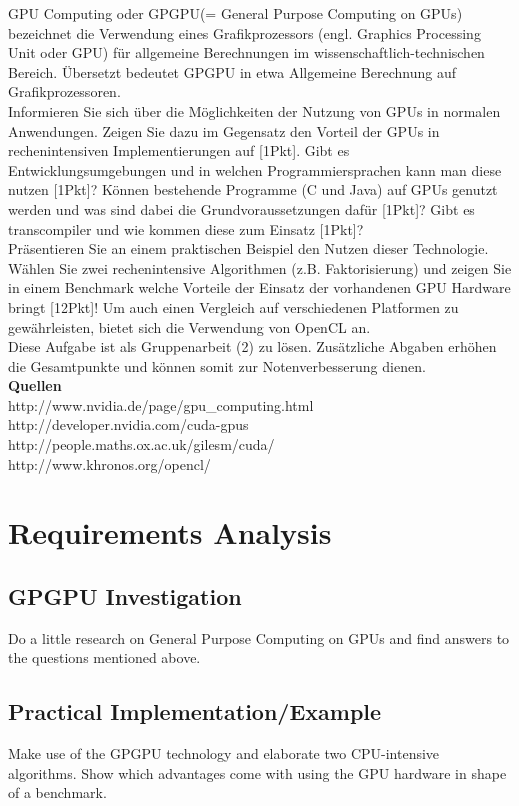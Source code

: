 \documentclass[11pt, a4paper]{article}
\begin{document}
GPU Computing oder GPGPU(= General Purpose Computing on GPUs) bezeichnet die Verwendung eines Grafikprozessors (engl. Graphics Processing Unit oder GPU) für allgemeine Berechnungen im wissenschaftlich-technischen Bereich. Übersetzt bedeutet GPGPU in etwa Allgemeine Berechnung auf Grafikprozessoren. \\

Informieren Sie sich über die Möglichkeiten der Nutzung von GPUs in normalen Anwendungen. Zeigen Sie dazu im Gegensatz den Vorteil der GPUs in rechenintensiven Implementierungen auf [1Pkt]. Gibt es Entwicklungsumgebungen und in welchen Programmiersprachen kann man diese nutzen [1Pkt]? Können bestehende Programme (C und Java) auf GPUs genutzt werden und was sind dabei die Grundvoraussetzungen dafür [1Pkt]? Gibt es transcompiler und wie kommen diese zum Einsatz [1Pkt]? \\

Präsentieren Sie an einem praktischen Beispiel den Nutzen dieser Technologie. Wählen Sie zwei rechenintensive Algorithmen (z.B. Faktorisierung) und zeigen Sie in einem Benchmark welche Vorteile der Einsatz der vorhandenen GPU Hardware bringt [12Pkt]! Um auch einen Vergleich auf verschiedenen Platformen zu gewährleisten, bietet sich die Verwendung von OpenCL an. \\

Diese Aufgabe ist als Gruppenarbeit (2) zu lösen. Zusätzliche Abgaben erhöhen die Gesamtpunkte und können somit zur Notenverbesserung dienen. \\

\textbf{Quellen} \\
http://www.nvidia.de/page/gpu\_computing.html \\
http://developer.nvidia.com/cuda-gpus \\
http://people.maths.ox.ac.uk/gilesm/cuda/ \\
http://www.khronos.org/opencl/ \\

\newpage

\section{Requirements Analysis}
\subsection{GPGPU Investigation}
Do a little research on General Purpose Computing on GPUs and find answers to the questions mentioned above.
\subsection{Practical Implementation/Example}
Make use of the GPGPU technology and elaborate two CPU-intensive algorithms. Show which advantages come with using the GPU hardware in shape of a benchmark.
\end{document}
